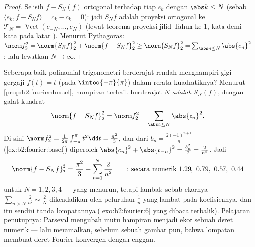 \begin{proof}
Selisih $f - S_N(f)$ ortogonal terhadap tiap $e_k$ dengan $\abs k \leq N$ (sebab $\langle
e_k, f - S_N f\rangle = c_k - c_k = 0$): jadi $S_Nf$ adalah proyeksi
ortogonal ke $\mathcal{T}_N = \operatorname{Vect}(e_{-N}, \dots,
e_N)$ (lewat teorema proyeksi jilid Tahun ke-1, kata demi kata pada
latar ). Menurut Pythagoras: $\norm f_2^2 = \norm{S_Nf}_2^2 +
\norm{f - S_Nf}_2^2 \geq \norm{S_Nf}_2^2 = \sum_{\abs n \leq N}
\abs{c_n}^2$; lalu lewatkan $N \to \infty$.
\end{proof}

\begin{example}\label{ex:b2:fourier:bestapprox}
Seberapa baik polinomial trigonometri berderajat rendah menghampiri
gigi gergaji $f(t) = t$ (pada $\intoo{-\pi}{\pi}$) dalam
rerata kuadratiknya? Menurut \cref{prop:b2:fourier:bessel}, hampiran
terbaik berderajat $N$ \emph{adalah} $S_N(f)$, dengan galat kuadrat
\[
\norm{f - S_Nf}_2^2 = \norm f_2^2 -
\sum_{\abs n\leq N}\abs{c_n}^2 .
\]
Di sini $\norm f_2^2 = \frac{1}{2\pi}\int_{-\pi}^\pi t^2\dd t =
\frac{\pi^2}{3}$, dan dari $b_n = \frac{2(-1)^{n+1}}{n}$
(\cref{ex:b2:fourier:basel}) diperoleh $\abs{c_n}^2 + \abs{c_{-n}}^2 =
\frac{b_n^2}{2} = \frac{2}{n^2}$. Jadi
\[
\norm{f - S_Nf}_2^2
= \frac{\pi^2}{3} - \sum_{n=1}^{N}\frac{2}{n^2}
\qquad\text{: secara numerik } 1.29,\ 0.79,\ 0.57,\ 0.44
\]
untuk $N = 1, 2, 3, 4$ --- yang menurun, tetapi lambat: sebab ekornya
$\sum_{n>N}\frac2{n^2} \sim \frac2N$ dikendalikan oleh peluruhan
$\frac1n$ yang lambat pada koefisiennya, dan itu sendiri tanda
lompatannya (\cref{exo:b2:fourier:6} yang dibaca terbalik). Pelajaran
penutupnya: Parseval mengubah mutu hampiran menjadi ekor sebuah
deret numerik --- lalu meramalkan, sebelum sebuah gambar pun, bahwa
lompatan membuat deret Fourier konvergen dengan enggan.
\end{example}


